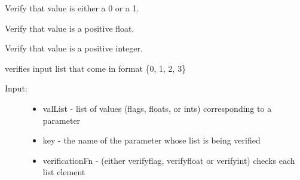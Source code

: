 \documentclass[letterpaper,10pt,english]{sphinxmanual}
\begin{document}
\begin{fulllineitems}

\begin{fulllineitems}
\label{pydfnworks:pydfnworks.helper.input_helper.verify_flag}
Verify that value is either a 0 or a 1.

\end{fulllineitems}


\begin{fulllineitems}
\label{pydfnworks:pydfnworks.helper.input_helper.verify_float}
Verify that value is a positive float.

\end{fulllineitems}


\begin{fulllineitems}
\label{pydfnworks:pydfnworks.helper.input_helper.verify_int}
Verify that value is a positive integer.

\end{fulllineitems}


\begin{fulllineitems}
\label{pydfnworks:pydfnworks.helper.input_helper.verify_list}
verifies input list that come in format \{0, 1, 2, 3\}
\begin{description}
\item[{Input: }] \leavevmode\begin{itemize}
\item {} 
valList - list of values (flags, floats, or ints) corresponding to a parameter

\item {} 
key - the name of the parameter whose list is being verified

\item {} 
verificationFn - (either verifyflag, verifyfloat or verifyint) checks each list element


\end{itemize}
\end{description}
\end{fulllineitems}
\end{fulllineitems}
\end{document}
